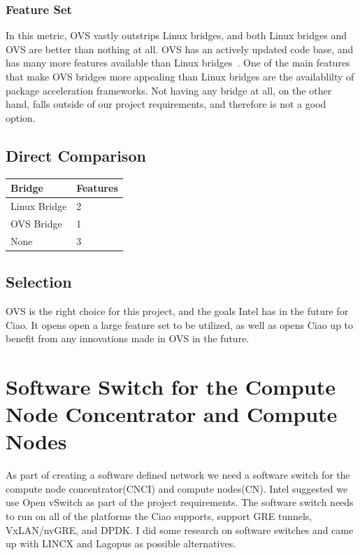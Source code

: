 \documentclass[10pt,letterpaper,onecolumn,journal]{IEEEtran}
\begin{document}
\subsubsection{Feature Set}
In this metric, OVS vastly outstrips Linux bridges, and both Linux bridges and
OVS are better than nothing at all. OVS has an actively updated code base, and
has many more features available than Linux bridges~\cite{ovs-linuxbridge}. One
of the main features that make OVS bridges more appealing than Linux bridges are
the availablilty of package acceleration frameworks. Not having any bridge at
all, on the other hand, falls outside of our project requirements, and therefore
is not a good option.

\subsection{Direct Comparison}
\begin{center}
	\begin{tabular}{| l | l |}
		\hline
		Bridge & Features \\ \hline
		Linux Bridge & 2 \\ \hline
		OVS Bridge & 1 \\ \hline
		None & 3 \\ \hline
	\end{tabular}
\end{center}

\subsection{Selection}
OVS is the right choice for this project, and the goals Intel has in the future
for Ciao. It opens open a large feature set to be utilized, as well as opens
Ciao up to benefit from any innovations made in OVS in the future.


\section{Software Switch for the Compute Node Concentrator and Compute Nodes}
As part of creating a software defined network we need a software switch for the compute node concentrator(CNCI) and compute nodes(CN). 
Intel suggested we use Open vSwitch as part of the project requirements. 
The software switch needs to run on all of the platforms the Ciao supports, support GRE tunnels, VxLAN/nvGRE, and DPDK.
I did some research on software switches and came up with LINCX and Lagopus as possible alternatives.
\end{document}
